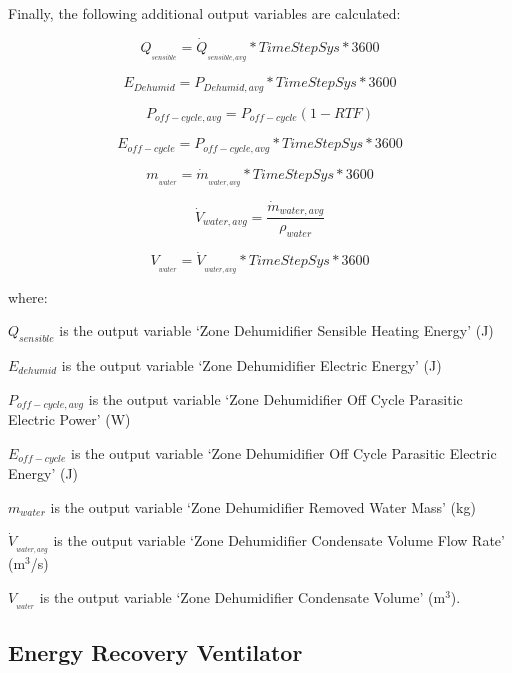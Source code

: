 Finally, the following additional output variables are calculated:

\begin{equation}
{Q_{_{sensible}}} = {\dot Q_{_{sensible,avg}}}*TimeStepSys*3600
\end{equation}

\begin{equation}
{E_{Dehumid}} = {P_{Dehumid,avg}}*TimeStepSys*3600
\end{equation}

\begin{equation}
{P_{off - cycle,avg}} = {P_{off - cycle}}\left( {1 - RTF} \right)
\end{equation}

\begin{equation}
{E_{off - cycle}} = {P_{off - cycle,avg}}*TimeStepSys*3600
\end{equation}

\begin{equation}
{m_{_{water}}} = {\dot m_{_{water,avg}}}*TimeStepSys*3600
\end{equation}

\begin{equation}
\dot{V}_{water,avg} = \frac{\dot{m}_{water,avg}}{\rho_{water}}
\end{equation}

\begin{equation}
{V_{_{water}}} = {\dot V_{_{water,avg}}}*TimeStepSys*3600
\end{equation}

where:

\(Q_{sensible}\) is the output variable `Zone Dehumidifier Sensible Heating Energy' (J)

\(E_{dehumid}\) is the output variable `Zone Dehumidifier Electric Energy' (J)

\(P_{off-cycle,avg}\) is the output variable `Zone Dehumidifier Off Cycle Parasitic Electric Power' (W)

\(E_{off-cycle}\) is the output variable `Zone Dehumidifier Off Cycle Parasitic Electric Energy' (J)

\(m_{water}\) is the output variable `Zone Dehumidifier Removed Water Mass' (kg)

\({\dot V_{_{water,avg}}}\) is the output variable `Zone Dehumidifier Condensate Volume Flow Rate' (m\(^{3}\)/s)

\({V_{_{water}}}\) is the output variable `Zone Dehumidifier Condensate Volume' (m\(^{3}\)).

\subsection{Energy Recovery Ventilator}\label{energy-recovery-ventilator}

